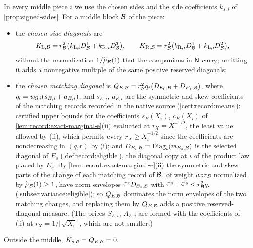 In every middle piece $i$ we use the chosen sides and the side coefficients
$k_{s,i}$ of \cref{prop:signed-sides}. For a middle block $\mathcal B$ of the piece:
\begin{itemize}
\item the \emph{chosen side diagonals} are
 \[
  K_{{\rm L},\mathcal B}=r_\mathcal B^2\bigl(k_{{\rm L},i}D^1_\mathcal B+k_{{\rm R},i}D^2_\mathcal B\bigr),\qquad
  K_{{\rm R},\mathcal B}=r_\mathcal B^2\bigl(k_{{\rm R},i}D^1_\mathcal B+k_{{\rm L},i}D^2_\mathcal B\bigr),
 \]
 without the normalization $1/\widetilde\mu_\mathcal B(1)$ that the companions in $\mathsf N$
 carry; omitting it adds a nonnegative multiple of the same positive reserved
 diagonals;
\item the \emph{chosen matching diagonal} is
 $Q_{E,\mathcal B}=r_\mathcal B^2q_i\bigl(D_{E_0,\mathcal B}+D_{E_1,\mathcal B}\bigr)$, where
 $q_i=w_{{\rm S},i}(s_{E,i}+a_{E,i})$, and $s_{E,i}$, $a_{E,i}$ are the symmetric
 and skew coefficients of the matching records recorded in the native source
 (\cref{cert:record:means}): certified upper bounds for the coefficients
 $s_E(X_i)$, $a_E(X_i)$ of \cref{lem:record:exact-marginal-e}(ii) evaluated at $r_X=X_i^{-1/2}$, the least value allowed by (ii), which permits every $r_X\ge X_i^{-1/2}$ since the coefficients are nondecreasing in $(q,r)$ by (i); and
 $D_{E_s,\mathcal B}=\operatorname{Diag}_\iota(m_{E_s,\mathcal B})$ is the selected diagonal of $E_s$
 (\cref{def:record:eligible}), the diagonal copy at $\iota$ of the product law
 placed by $E_s$. By \cref{lem:record:exact-marginal-e}(ii) the symmetric and skew
 parts of the change of each matching record of $\mathcal B$, of weight $w_{\rm S}r_\mathcal B$
 normalized by $\widetilde\mu_\mathcal B(1)\ge1$, have norm envelopes
 $\tilde\pi^\epsilon D_{E_s,\mathcal B}$ with $\tilde\pi^{\rm s}+\tilde\pi^{\rm a}\le r_\mathcal B^2q_i$
 (\cref{subsec:variance:eligible}); so $Q_{E,\mathcal B}$ dominates the norm envelopes of
 the two matching changes, and replacing them by $Q_{E,\mathcal B}$ adds a positive
 reserved-diagonal measure. (The prices $S_{E,i}$, $A_{E,i}$ are formed with the
 coefficients of (ii) at $r_X=1/\lfloor\sqrt{X_i}\rfloor$, which are not smaller.)
\end{itemize}
Outside the middle, $K_{s,\mathcal B}=Q_{E,\mathcal B}=0$.

